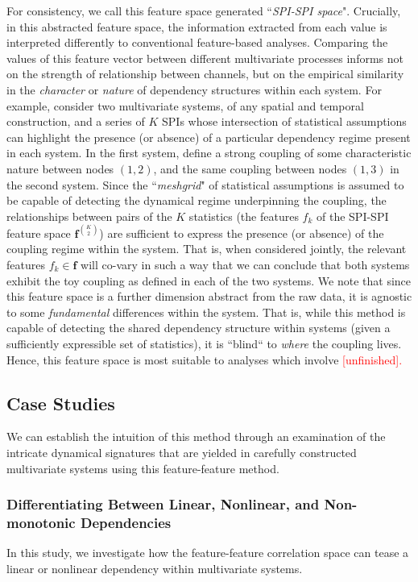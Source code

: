 \documentclass{article}
\theoremstyle{plain}
\theoremstyle{definition}
\theoremstyle{remark}
\begin{document}
For consistency, we call this feature space generated ``\textit{SPI-SPI space}". Crucially, in this abstracted feature space, the information extracted from each value is interpreted differently to conventional feature-based analyses. Comparing the values of this feature vector between different multivariate processes informs not on the strength of relationship between channels, but on the empirical similarity in the \textit{character} or \textit{nature} of dependency structures within each system. For example, consider two multivariate systems, of any spatial and temporal construction, and a series of $K$ SPIs whose intersection of statistical assumptions can highlight the presence (or absence) of a particular dependency regime present in each system. In the first system, define a strong coupling of some characteristic nature between nodes $(1, 2)$, and the same coupling between nodes $(1, 3)$ in the second system. Since the ``\textit{meshgrid}" of statistical assumptions is assumed to be capable of detecting the dynamical regime underpinning the coupling, the relationships between pairs of the $K$ statistics (the features $f_k$ of the SPI-SPI feature space $\mathbf{f}^{K \choose 2}$) are sufficient to express the presence (or absence) of the coupling regime within the system. That is, when considered jointly, the relevant features $f_k \in \mathbf{f}$ will co-vary in such a way that we can conclude that both systems exhibit the toy coupling as defined in each of the two systems. We note that since this feature space is a further dimension abstract from the raw data, it is agnostic to some \textit{fundamental} differences within the system. That is, while this method is capable of detecting the shared dependency structure within systems (given a sufficiently expressible set of statistics), it is ``blind`` to \textit{where} the coupling lives. Hence, this feature space is most suitable to analyses which involve \textcolor{red}{[unfinished].}


\subsection{Case Studies}
We can establish the intuition of this method through an examination of the intricate dynamical signatures that are yielded in carefully constructed multivariate systems using this feature-feature method.

\subsubsection{Differentiating Between Linear, Nonlinear, and Non-monotonic Dependencies}
In this study, we investigate how the feature-feature correlation space can tease a linear or nonlinear dependency within multivariate systems.
\end{document}
